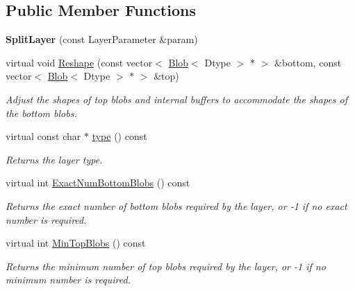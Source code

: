 \subsection*{Public Member Functions}
\begin{DoxyCompactItemize}
\item 
{\bfseries Split\+Layer} (const Layer\+Parameter \&param)\hypertarget{classcaffe_1_1SplitLayer_a784222a81f1921b68bf814fc9dc5d1aa}{}\label{classcaffe_1_1SplitLayer_a784222a81f1921b68bf814fc9dc5d1aa}

\item 
virtual void \hyperlink{classcaffe_1_1SplitLayer_a931cb3c53f96911b7ad899bd211a3bdc}{Reshape} (const vector$<$ \hyperlink{classcaffe_1_1Blob}{Blob}$<$ Dtype $>$ $\ast$ $>$ \&bottom, const vector$<$ \hyperlink{classcaffe_1_1Blob}{Blob}$<$ Dtype $>$ $\ast$ $>$ \&top)
\begin{DoxyCompactList}\small\item\em Adjust the shapes of top blobs and internal buffers to accommodate the shapes of the bottom blobs. \end{DoxyCompactList}\item 
virtual const char $\ast$ \hyperlink{classcaffe_1_1SplitLayer_a0324fc0dda19c627a27203d29693df23}{type} () const \hypertarget{classcaffe_1_1SplitLayer_a0324fc0dda19c627a27203d29693df23}{}\label{classcaffe_1_1SplitLayer_a0324fc0dda19c627a27203d29693df23}

\begin{DoxyCompactList}\small\item\em Returns the layer type. \end{DoxyCompactList}\item 
virtual int \hyperlink{classcaffe_1_1SplitLayer_abdf26784113e37451b5c9e4b5181badb}{Exact\+Num\+Bottom\+Blobs} () const 
\begin{DoxyCompactList}\small\item\em Returns the exact number of bottom blobs required by the layer, or -\/1 if no exact number is required. \end{DoxyCompactList}\item 
virtual int \hyperlink{classcaffe_1_1SplitLayer_a76479b257d53d19d539a09798c81f0cb}{Min\+Top\+Blobs} () const 
\begin{DoxyCompactList}\small\item\em Returns the minimum number of top blobs required by the layer, or -\/1 if no minimum number is required. \end{DoxyCompactList}\end{DoxyCompactItemize}
